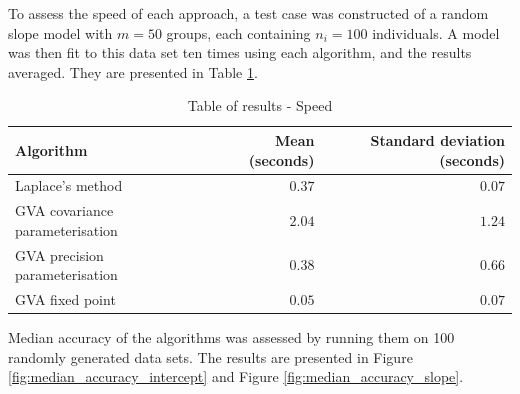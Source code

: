 To assess the speed of each approach, a test case was constructed of a random
slope model with $m=50$ groups, each containing $n_i = 100$ individuals. A
model was then fit to this data set ten times using each algorithm, and the
results averaged. They are presented in Table
\ref{tab:application_slope_speed}.

\begin{table}
	\begin{tabular}{|l|rr|}
		\hline
		Algorithm & Mean (seconds) & Standard deviation (seconds) \\
		\hline
		Laplace's method & $0.37$ & $0.07$ \\
		GVA covariance parameterisation & $2.04$ & $1.24$ \\
		GVA precision parameterisation & $0.38$ & $0.66$ \\
		GVA fixed point & $0.05$ & $0.07$ \\
		\hline
	\end{tabular}
	\caption{Table of results - Speed}
	\label{tab:application_slope_speed}
\end{table}

		
Median accuracy of the algorithms was assessed by running them on 100 randomly
generated data sets. The	results are presented in Figure
\ref{fig:median_accuracy_intercept} and Figure \ref{fig:median_accuracy_slope}.
		
